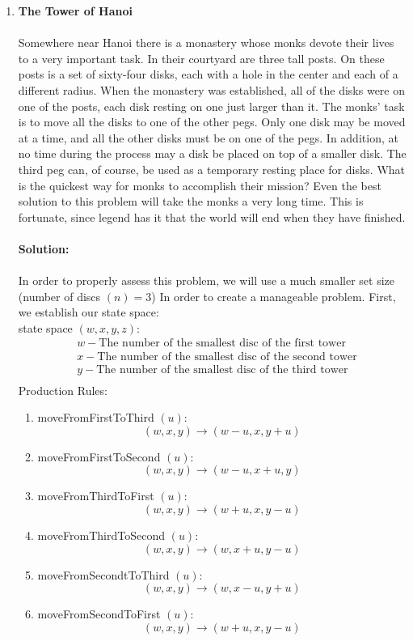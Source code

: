 \documentclass[11pt]{article}
\begin{document}
\begin{enumerate}
\item \textbf{The Tower of Hanoi}\\\\
Somewhere near Hanoi there is a monastery whose monks devote their lives to
a very important task. In their courtyard are three tall posts. On these posts is a
set of sixty-four disks, each with a hole in the center and each of a different
radius. When the monastery was established, all of the disks were on one of the
posts, each disk resting on one just larger than it. The monks' task is to move
all the disks to one of the other pegs. Only one disk may be moved at a time,
and all the other disks must be on one of the pegs. In addition, at no time
during the process may a disk be placed on top of a smaller disk. The third peg
can, of course, be used as a temporary resting place for disks. What is the
quickest way for monks to accomplish their mission?
 Even the best solution to this problem will take the monks a very long time.
This is fortunate, since legend has it that the world will end when they have finished.\\\\
\textbf{Solution:}\\\\
In order to properly assess this problem, we will use a much smaller set size (number of discs $(n) = 3$) In order to create a manageable problem. 
First, we establish our state space: \\
state space $(w, x, y, z)$:
\begin{align*}
&w - \text{The number of the smallest disc of the first tower}\\
&x - \text{The number of the smallest disc of the second tower} \\
&y - \text{The number of the smallest disc of the third tower} \\
\end{align*}
Production Rules: 
\begin{enumerate}
\item  moveFromFirstToThird $(u):$\\
$$(w, x, y) \rightarrow (w - u, x, y+u)$$
\item  moveFromFirstToSecond $(u):$\\
$$(w, x, y) \rightarrow (w - u, x+u, y)$$
\item  moveFromThirdToFirst $(u):$\\
$$(w, x, y) \rightarrow (w + u, x, y- u)$$
\item  moveFromThirdToSecond $(u):$\\
$$(w, x, y) \rightarrow (w, x+u, y-u)$$
\item  moveFromSecondtToThird $(u):$\\
$$(w, x, y) \rightarrow (w, x - u, y+u)$$
\item  moveFromSecondToFirst $(u):$\\
$$(w, x, y) \rightarrow (w + u, x, y - u)$$
\end{enumerate}


\end{enumerate}
\end{document}
